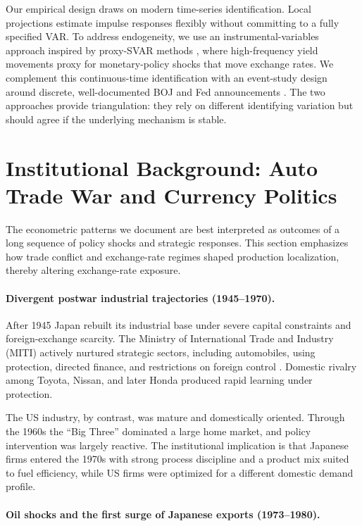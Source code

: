 \documentclass[12pt,a4paper]{article}
\begin{document}
Our empirical design draws on modern time-series identification. Local projections \citep{jorda2005} estimate impulse responses flexibly without committing to a fully specified VAR. To address endogeneity, we use an instrumental-variables approach inspired by proxy-SVAR methods \citep{stock2012,mertens2013}, where high-frequency yield movements proxy for monetary-policy shocks that move exchange rates. We complement this continuous-time identification with an event-study design around discrete, well-documented BOJ and Fed announcements \citep{mackinlay1997}. The two approaches provide triangulation: they rely on different identifying variation but should agree if the underlying mechanism is stable.

\section{Institutional Background: Auto Trade War and Currency Politics}

The econometric patterns we document are best interpreted as outcomes of a long sequence of policy shocks and strategic responses. This section emphasizes how trade conflict and exchange-rate regimes shaped production localization, thereby altering exchange-rate exposure.

\paragraph{Divergent postwar industrial trajectories (1945--1970).}

After 1945 Japan rebuilt its industrial base under severe capital constraints and foreign-exchange scarcity. The Ministry of International Trade and Industry (MITI) actively nurtured strategic sectors, including automobiles, using protection, directed finance, and restrictions on foreign control \citep{johnson1982}. Domestic rivalry among Toyota, Nissan, and later Honda produced rapid learning under protection.

The US industry, by contrast, was mature and domestically oriented. Through the 1960s the ``Big Three'' dominated a large home market, and policy intervention was largely reactive. The institutional implication is that Japanese firms entered the 1970s with strong process discipline and a product mix suited to fuel efficiency, while US firms were optimized for a different domestic demand profile.

\paragraph{Oil shocks and the first surge of Japanese exports (1973--1980).}
\end{document}
